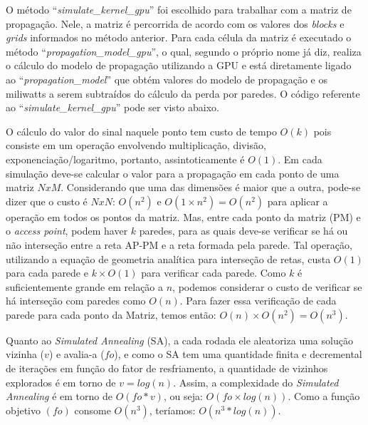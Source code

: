 \documentclass[
	12pt,				%
	twoside,			%
	a4paper,			%
	english,			%
	french,				%
	spanish,			%
	brazil				%
	]{abntex2}
\begin{document}
O método ``\emph{simulate\_kernel\_gpu}'' foi escolhido para trabalhar
com a matriz de propagação. Nele, a matriz é percorrida de acordo com os
valores dos \emph{blocks} e \emph{grids} informados no método anterior.
Para cada célula da matriz é executado o método
``\emph{propagation\_model\_gpu}'', o qual, segundo o próprio nome já
diz, realiza o cálculo do modelo de propagação utilizando a GPU e está
diretamente ligado ao ``\emph{propagation\_model}'' que obtém valores do
modelo de propagação e os miliwatts a serem subtraídos do cálculo da
perda por paredes. O código referente ao
``\emph{simulate\_kernel\_gpu}'' pode ser visto abaixo.

\begin{center}
    \fbox{
        
    }
\end{center}

O cálculo do valor do sinal naquele ponto tem custo de tempo \(O(k)\)
pois consiste em um operação envolvendo multiplicação, divisão,
exponenciação/logaritmo, portanto, assintoticamente é \(O(1)\). Em cada
simulação deve-se calcular o valor para a propagação em cada ponto de
uma matriz \(NxM\). Considerando que uma das dimensões é maior que a
outra, pode-se dizer que o custo é \(NxN\): \(O(n^{2})\) e
\(O(1\times n^{2}) = O(n^{2})\) para aplicar a operação em todos os
pontos da matriz. Mas, entre cada ponto da matriz (PM) e o \emph{access
point}, podem haver \(k\) paredes, para as quais deve-se verificar se há
ou não interseção entre a reta AP-PM e a reta formada pela parede. Tal
operação, utilizando a equação de geometria analítica para interseção de
retas, custa \(O(1)\) para cada parede e \(k\times O(1)\) para verificar
cada parede. Como \(k\) é suficientemente grande em relação a \(n\),
podemos considerar o custo de verificar se há interseção com paredes
como \(O(n)\). Para fazer essa verificação de cada parede para cada
ponto da Matriz, temos então: \(O(n)\times O(n^{2}) = O(n^{3})\).

Quanto ao \emph{Simulated Annealing} (SA), a cada rodada ele aleatoriza
uma solução vizinha (\(v\)) e avalia-a (\(fo\)), e como o SA tem uma
quantidade finita e decremental de iterações em função do fator de
resfriamento, a quantidade de vizinhos explorados é em torno de
\(v = log(n)\). Assim, a complexidade do \emph{Simulated Annealing} é em
torno de \(O(fo*v)\), ou seja: \(O(fo \times log (n))\). Como a função
objetivo \((fo)\) consome \(O(n^{3})\), teríamos:
\(O(n^{3} * log (n))\).
\end{document}
